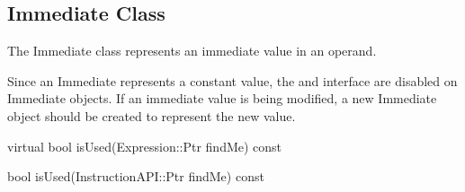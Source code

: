 \subsection{Immediate Class}
\label{sec:immediate}

The Immediate class represents an immediate value in an operand.

Since an Immediate represents a constant value, the  and
 interface are disabled on Immediate objects. If an immediate
value is being modified, a new Immediate object should be created to represent
the new value. 

\begin{apient}
virtual bool isUsed(Expression::Ptr findMe) const
\end{apient}

\begin{apient}
bool isUsed(InstructionAPI::Ptr findMe) const
\end{apient}

